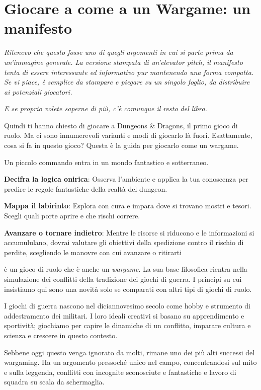 \chapter{Giocare a \dnd come a un Wargame: un manifesto}

\textit{Ritenevo che questo fosse uno di quegli argomenti in cui si parte prima da un'immagine generale. La versione stampata di un'elevator pitch, il manifesto tenta di essere interessante ed informativo pur mantenendo una forma compatta. Se vi piace, è semplice da stampare e piegare su un singolo foglio, da distribuire ai potenziali giocatori.}

\textit{E se proprio volete saperne di più, c'è comunque il resto del libro.}

\clearpage

Quindi ti hanno chiesto di giocare a Dungeons \& Dragons, il primo gioco di ruolo. Ma ci sono innumerevoli varianti e modi di giocarlo là fuori. Esattamente, cosa si fa in questo gioco? Questa è la guida per giocarlo come un wargame.


Un piccolo commando entra in un mondo fantastico e sotterraneo.

\textbf{Decifra la logica onirica}: Osserva l'ambiente e applica la tua conoscenza per predire le regole fantastiche della realtà del dungeon.

\textbf{Mappa il labirinto}: Esplora con cura e impara dove si trovano mostri e tesori. Scegli quali porte aprire e che rischi correre.

\textbf{Avanzare o tornare indietro}: Mentre le risorse si riducono e le informazioni si accumululano, dovrai valutare gli obiettivi della spedizione contro il rischio di perdite, scegliendo le manovre con cui avanzare o ritirarti


\dnd è un gioco di ruolo che è anche un \textit{wargame}. La sua base filosofica rientra nella simulazione dei conflitti della tradizione dei giochi di guerra. I principi su cui insistiamo qui sono una novità solo se comparati con altri tipi di giochi di ruolo.

I giochi di guerra nascono nel diciannovesimo secolo come hobby e strumento di addestramento dei militari. I loro ideali creativi si basano su apprendimento e sportività; giochiamo per capire le dinamiche di un conflitto, imparare cultura e scienza e crescere in questo contesto.

Sebbene oggi questo venga ignorato da molti, \dnd rimane uno dei più alti successi del wargaming. Ha un argomento pressoché unico nel campo, concentrandosi sul mito e sulla leggenda, conflitti con incognite sconosciute e fantastiche e lavoro di squadra su scala da schermaglia.

